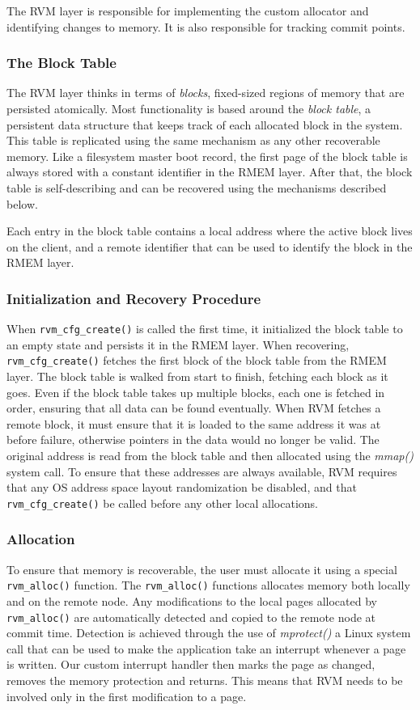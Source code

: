 The RVM layer is responsible for implementing the custom allocator and
identifying changes to memory. It is also responsible for tracking commit
points.

\subsubsection{The Block Table}
The RVM layer thinks in terms of \emph{blocks}, fixed-sized regions of
memory that are persisted atomically. Most functionality is based around the
\emph{block table}, a persistent data structure that keeps track of each
allocated block in the system. This table is replicated using the same
 mechanism as any other recoverable memory. Like a filesystem master boot record,
 the first page of the block table is always
stored with a constant identifier in the RMEM layer. After that, the block table
is self-describing and can be recovered using the mechanisms described below.

Each entry in the block table contains a local address where the active block
lives on the client, and a remote identifier that can be used to identify the
block in the RMEM layer. 

\subsubsection{Initialization and Recovery Procedure}
When \verb|rvm_cfg_create()| is called the first time, it initialized the
block table to an empty state and persists it in the RMEM layer. When
recovering, \verb|rvm_cfg_create()| fetches the first block of the block table from the
RMEM layer. The block table is walked from start to finish, fetching each block as it goes. Even if the block table takes up multiple blocks, each one is fetched in order, ensuring that all data
can be found eventually. When RVM fetches a remote block, it must ensure that it
is loaded to the same address it was at before failure, otherwise pointers in
the data would no longer be valid. The original address is read from the block
table and then allocated using the \emph{mmap()} system call. To ensure that
these addresses are always available, RVM requires that any OS address space
layout randomization be disabled, and that \verb|rvm_cfg_create()| be called before any
other local allocations.

\subsubsection{Allocation}
To ensure that memory is recoverable, the user must allocate it using a special
\verb|rvm_alloc()| function. The \verb|rvm_alloc()| functions allocates memory both locally and on the remote
node. Any modifications to the local pages allocated by \verb|rvm_alloc()| are
automatically detected and copied to the remote node at commit time. Detection
is achieved through the use of \emph{mprotect()} a Linux system call that
can be used to make the application take an interrupt whenever a page is
written. Our custom interrupt handler then marks the page as changed, removes
the memory protection and returns. This means that RVM needs to be involved only
in the first modification to a page.

